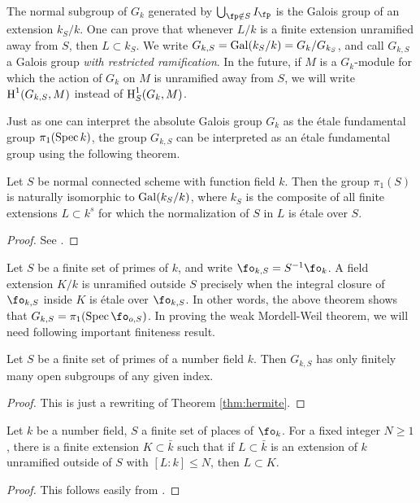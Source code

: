 The normal subgroup of $G_k$ generated by $\bigcup_{\fp\notin S} I_\fp$ is the 
Galois group of an extension $k_S/k$. One can prove that whenever $L/k$ is a 
finite extension unramified away from $S$, then $L\subset k_S$. We write 
$G_{k,S}=\operatorname{Gal}(k_S/k) = G_k/G_{k_S}$, and call $G_{k,S}$ a Galois 
group \emph{with restricted ramification}. In the future, if $M$ is a 
$G_k$-module for which the action of $G_k$ on $M$ is unramified away from 
$S$, we will write $\operatorname{H}^1(G_{k,S},M)$ instead of $\operatorname{H}_S^1(G_k,M)$. 

Just as one can interpret the 
absolute Galois group $G_k$ as the \'etale fundamental group 
$\pi_1(\operatorname{Spec} k)$, the group $G_{k,S}$ can be interpreted as an \'etale 
fundamental group using the following theorem.

\begin{theorem}
Let $S$ be normal connected scheme with function field $k$. Then the group 
$\pi_1(S)$ is naturally isomorphic to $\operatorname{Gal}(k_S/k)$, where $k_S$ is the 
composite of all finite extensions $L\subset k^s$ for which the normalization 
of $S$ in $L$ is \'etale over $S$. 
\end{theorem}
\begin{proof}
See \cite[5.4.9]{sz09}.
\end{proof}


Let $S$ be a finite set of primes of $k$, and write $\fo_{k,S}=S^{-1} \fo_k$. A 
field extension $K/k$ is unramified outside $S$ precisely when the integral 
closure of $\fo_{k,S}$ inside $K$ is \'etale over $\fo_{k,S}$. In other words, 
the above theorem shows that $G_{k,S} = \pi_1(\spec \fo_{o,S})$. In proving the 
weak Mordell-Weil theorem, we will need following important finiteness result. 

\begin{theorem}\label{thm:hermite-fund}
Let $S$ be a finite set of primes of a number field $k$. Then $G_{k,S}$ has 
only finitely many open subgroups of any given index. 
\end{theorem}
\begin{proof}
This is just a rewriting of Theorem \ref{thm:hermite}. 
\end{proof}

\begin{theorem}[Hermite]\label{thm:hermite}
Let $k$ be a number field, $S$ a finite set of places of $\fo_k$. For a fixed 
integer $N\geqslant 1$, there is a finite extension $K\subset \bar k$ such that 
if $L\subset \bar k$ is an extension of $k$ unramified outside of $S$ with 
$[L:k]\leqslant N$, then $L\subset K$. 
\end{theorem}
\begin{proof}
This follows easily from \cite[B.2.14]{bg06}. 
\end{proof}


